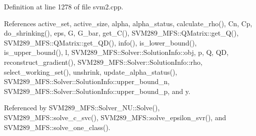 Definition at line 1278 of file svm2.\+cpp.



References active\+\_\+set, active\+\_\+size, alpha, alpha\+\_\+status, calculate\+\_\+rho(), Cn, Cp, do\+\_\+shrinking(), eps, G, G\+\_\+bar, get\+\_\+\+C(), S\+V\+M289\+\_\+\+M\+F\+S\+::\+Q\+Matrix\+::get\+\_\+\+Q(), S\+V\+M289\+\_\+\+M\+F\+S\+::\+Q\+Matrix\+::get\+\_\+\+Q\+D(), info(), is\+\_\+lower\+\_\+bound(), is\+\_\+upper\+\_\+bound(), l, S\+V\+M289\+\_\+\+M\+F\+S\+::\+Solver\+::\+Solution\+Info\+::obj, p, Q, QD, reconstruct\+\_\+gradient(), S\+V\+M289\+\_\+\+M\+F\+S\+::\+Solver\+::\+Solution\+Info\+::rho, select\+\_\+working\+\_\+set(), unshrink, update\+\_\+alpha\+\_\+status(), S\+V\+M289\+\_\+\+M\+F\+S\+::\+Solver\+::\+Solution\+Info\+::upper\+\_\+bound\+\_\+n, S\+V\+M289\+\_\+\+M\+F\+S\+::\+Solver\+::\+Solution\+Info\+::upper\+\_\+bound\+\_\+p, and y.



Referenced by S\+V\+M289\+\_\+\+M\+F\+S\+::\+Solver\+\_\+\+N\+U\+::\+Solve(), S\+V\+M289\+\_\+\+M\+F\+S\+::solve\+\_\+c\+\_\+svc(), S\+V\+M289\+\_\+\+M\+F\+S\+::solve\+\_\+epsilon\+\_\+svr(), and S\+V\+M289\+\_\+\+M\+F\+S\+::solve\+\_\+one\+\_\+class().


